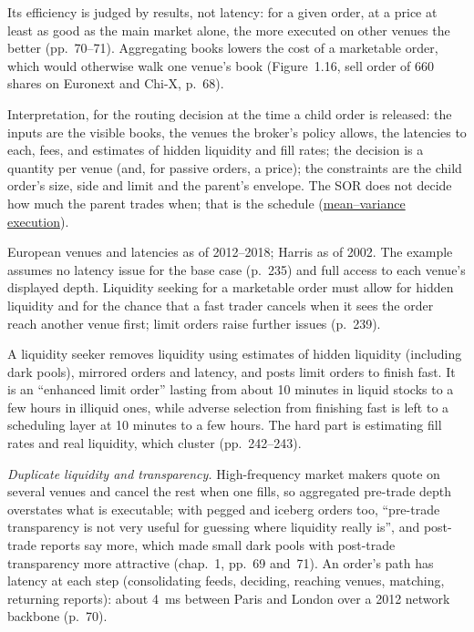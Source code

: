 \begin{qfdefinition}
Its efficiency is judged by results, not latency: for a given order, at a price at least as good as the main market alone, the more executed on other venues the better (pp.~70--71). Aggregating books lowers the cost of a marketable order, which would otherwise walk one venue's book (Figure~1.16, sell order of 660 shares on Euronext and Chi-X, p.~68).

 Interpretation, for the routing decision at the time a child order is released: the inputs are the visible books, the venues the broker's policy allows, the latencies to each, fees, and estimates of hidden liquidity and fill rates; the decision is a quantity per venue (and, for passive orders, a price); the constraints are the child order's size, side and limit and the parent's envelope. The SOR does not decide how much the parent trades when; that is the schedule (\hyperref[mod:almgren-chriss-execution]{mean--variance execution}).

 European venues and latencies as of 2012--2018; Harris as of 2002. The example assumes no latency issue for the base case (p.~235) and full access to each venue's displayed depth. Liquidity seeking for a marketable order must allow for hidden liquidity and for the chance that a fast trader cancels when it sees the order reach another venue first; limit orders raise further issues (p.~239).

A liquidity seeker removes liquidity using estimates of hidden liquidity (including dark pools), mirrored orders and latency, and posts limit orders to finish fast. It is an ``enhanced limit order'' lasting from about 10 minutes in liquid stocks to a few hours in illiquid ones, while adverse selection from finishing fast is left to a scheduling layer at 10 minutes to a few hours. The hard part is estimating fill rates and real liquidity, which cluster (pp.~242--243).

 \emph{Duplicate liquidity and transparency.} High-frequency market makers quote on several venues and cancel the rest when one fills, so aggregated pre-trade depth overstates what is executable; with pegged and iceberg orders too, ``pre-trade transparency is not very useful for guessing where liquidity really is'', and post-trade reports say more, which made small dark pools with post-trade transparency more attractive (chap.~1, pp.~69 and~71). An order's path has latency at each step (consolidating feeds, deciding, reaching venues, matching, returning reports): about 4~ms between Paris and London over a 2012 network backbone (p.~70).


\end{qfdefinition}
